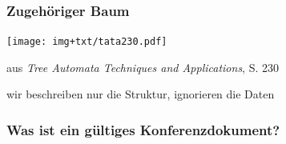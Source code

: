     \begin{frame}
      \frametitle{Zugehöriger Baum}

      \begin{minipage}[b]{\textwidth}
        \begin{exampleblock}{}
          \texttt{[image: img+txt/tata230.pdf]}
        \end{exampleblock}
      \end{minipage}
      \par
      \begin{footnotesize}
        \hspace*{\fill} aus \emph{Tree Automata Techniques and Applications}, S. 230
        \par
      \end{footnotesize}
      
      \par\bigskip
      \ddred{$\blacktriangleright$}  wir beschreiben nur die Struktur, ignorieren die Daten

    \end{frame}


    \begin{frame}
      \frametitle{Was ist ein gültiges Konferenzdokument?}

      \hspace*{1cm}
      
      

    \end{frame}

